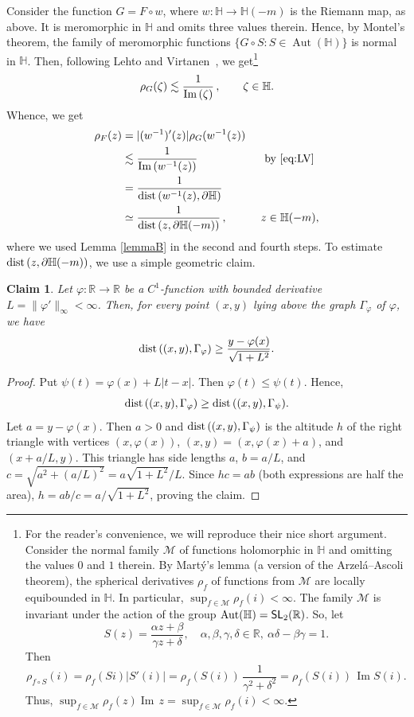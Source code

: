 \documentclass[12pt]{paper}
\newtheorem{claim}[theorem]{Claim}
\newcommand{\bR}{\mathbb R}
\newcommand{\bH}{\mathbb H}
\renewcommand{\phi}{\varphi}
\newcommand{\im}{{\rm Im}\,}
\begin{document}
Consider the function $G=F\circ w$, where
$w\colon \bH \to \bH(-m)$ is the Riemann map, as above.
It is meromorphic in $\bH$ and omits three values therein.
Hence, by Montel's theorem, the family of meromorphic functions $\{G\circ S\colon S\in {\operatorname{Aut}}(\bH)\}$ is normal in $\bH$.
Then, following Lehto and Virtanen~\cite[Theorem 3]{LV}, we get\footnote{
For the reader's convenience, we will reproduce their nice short argument.
Consider the normal family $\mathscr M$ of functions holomorphic in $\bH$ 
and omitting the values $0$ and $1$ therein. By Mart\'y's lemma
(a version of the Arzel\'a--Ascoli theorem), the spherical derivatives $\rho_f$ of functions 
from $\mathscr M$ are locally equibounded in $\bH$. In particular,  
$\displaystyle \sup_{f\in\mathscr M} \rho_f (i) < \infty$.
The family $\mathscr M$ is invariant under the action of the group $\operatorname{Aut}(\bH) = 
{\sf SL}_2(\bR)$. So, let
\[
S(z) = \frac{\alpha z + \beta}{\gamma z + \delta}, \quad \alpha, \beta, \gamma, \delta\in\bR, \ \alpha\delta - \beta \gamma =1.
\]
Then
\[
\rho_{f\circ S} (i) = \rho_f(Si) |S'(i)| 
=\rho_f(S(i))\, \frac1{\gamma^2+\delta^2} = \rho_f(S(i))\, \operatorname{Im} S(i).
\]
Thus, $\displaystyle \sup_{f\in\mathscr M} \rho_f(z) \operatorname{Im}\, z = \sup_{f\in\mathscr M} \rho_f(i) < \infty$.
}
\begin{equation}\label{eq:LV}
\rho_G(\zeta) \lesssim \frac1{\im (\zeta)}\,, \qquad \zeta\in\bH.
\end{equation}
Whence, we get
\begin{align}\label{eq:rho_F}
\nonumber \rho_F(z) &= |(w^{-1})'(z)| \rho_G(w^{-1}(z)) \\
\nonumber & \lesssim \frac1{\im (w^{-1}(z))} 
\qquad \qquad \qquad {\rm by\ }\eqref{eq:LV}
\\
\nonumber &= \frac1{ {\rm dist\,}(w^{-1}(z), \partial \bH)} \\
&\simeq \frac1{{\rm dist\,}(z, \partial \bH(-m)) }\,, \qquad \quad z\in \bH(-m),
\end{align}
where we used Lemma \ref{lemmaB} in the second and fourth steps.
To estimate ${\rm dist\,}(z, \partial \bH(-m)) $, we use a simple geometric claim.
\begin{claim}\label{claim:geom1} Let $\phi\colon \bR\to\bR$ be a $C^1$-function with
bounded derivative $L=\| \phi'\|_\infty <\infty$. Then, for every point $(x, y)$ lying above 
the graph $\Gamma_\phi$ of $\phi$, we have
\[
{\rm dist\,}((x, y), \Gamma_\phi) \ge \frac{y-\phi(x)}{\sqrt{1+L^2}}.
\]
\end{claim}
\begin{proof} Put $\psi (t) = \phi (x) + L|t-x|$. Then $\phi (t) \le \psi (t)$.
Hence, \[ {\rm dist\,}((x, y), \Gamma_\phi) \ge {\rm dist\,}((x, y), \Gamma_\psi). \] 
Let $a=y-\phi (x)$. Then $a>0$ and ${\rm dist\,}((x, y), \Gamma_\psi)$ is the altitude 
$h$ of the right triangle with vertices $(x, \phi (x))$, $(x, y)=(x, \phi(x)+a)$, and $(x+a/L, y)$. 
This triangle has side lengths $a$, $b=a/L$, and $c=\sqrt{a^2 + (a/L)^2} = \displaystyle
a\sqrt{1+L^2}/L$. Since $hc = ab$ (both
expressions are half the area), $h=ab/c = a/\sqrt{1+L^2}$, proving the claim.
\end{proof}
\end{document}
